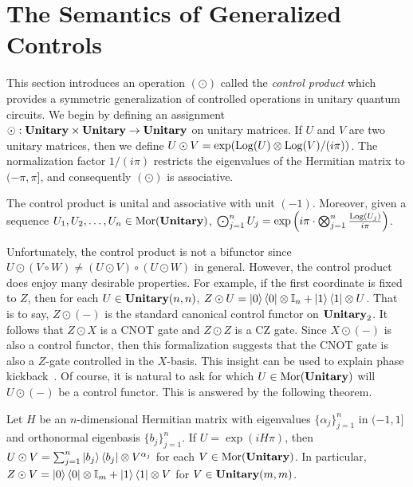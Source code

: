 \section{The Semantics of Generalized Controls}
%
\label{Sect:Semantics}

This section introduces an operation $( \odot )$ called the \emph{control product} which provides a symmetric generalization of controlled operations in unitary quantum circuits.
We begin by defining an assignment $\odot : \mathbf{Unitary} \times \mathbf{Unitary} \to \mathbf{Unitary}$ on unitary matrices.
If $U$ and $V$ are two unitary matrices, then we define $U \odot V = \exp( \operatorname{Log}(U) \otimes \operatorname{Log}(V) / ( i\pi ) )$.
The normalization factor $1 / ( i\pi )$ restricts the eigenvalues of the Hermitian matrix to $( -\pi, \pi ]$, and consequently $( \odot )$ is associative.

\begin{theorem}
    \label{Thm:ControlAssoc}
    The control product is unital and associative with unit $( -1 )$.
    Moreover, given a sequence $U_1, U_2, \ldots, U_n \in \operatorname{Mor}( \mathbf{Unitary} )$, $\bigodot_{j=1}^n U_j = \exp\left( i\pi \cdot \bigotimes_{j=1}^{n} \frac{\operatorname{Log}( U_j )}{i\pi} \right)$.
\end{theorem}

Unfortunately, the control product is not a bifunctor since $U \odot ( V \circ W ) \ne ( U \odot V ) \circ ( U \odot W )$ in general.
However, the control product does enjoy many desirable properties.
For example, if the first coordinate is fixed to $Z$, then for each $U \in \mathbf{Unitary}( n, n )$, $Z \odot U = \ket{0} \bra{0} \otimes \mathbb{I}_n + \ket{1} \bra{1} \otimes U$.
That is to say, $Z \odot( - )$ is the standard canonical control functor on $\mathbf{Unitary}_2$.
It follows that $Z \odot X$ is a \textsf{CNOT} gate and $Z \odot Z$ is a \textsf{CZ} gate.
Since $X \odot ( - )$ is also a control functor, then this formalization suggests that the \textsf{CNOT} gate is also a $Z$-gate controlled in the $X$-basis.
This insight can be used to explain phase kickback~\cite{OssorioCastillo2023}.
Of course, it is natural to ask for which $U \in \operatorname{Mor}( \mathbf{Unitary} )$ will $U \odot ( - )$ be a control functor.
This is answered by the following theorem.

\begin{theorem}
    \label{Thm:GenCtrlNF}
    Let $H$ be an $n$-dimensional Hermitian matrix with eigenvalues $\{ \alpha_j \}_{j=1}^n$ in $( -1, 1 ]$ and orthonormal eigenbasis $\{ b_j \}_{j=1}^n$.
    If $U = \exp( iH\pi )$, then $U \odot V = \sum_{j=1}^n \ket{b_j} \bra{b_j} \otimes V^{\alpha_j}$ for each $V \in \operatorname{Mor}( \mathbf{Unitary} )$.
    In particular, $Z \odot V = \ket{0} \bra{0} \otimes \mathbb{I}_m + \ket{1} \bra{1} \otimes V$ for $V \in \mathbf{Unitary}( m, m )$.
\end{theorem}

